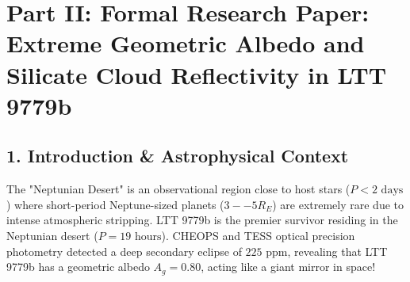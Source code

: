 \documentclass[11pt,a4paper]{article}
\begin{document}
\newpage

\section*{\Large Part II: Formal Research Paper: Extreme Geometric Albedo and Silicate Cloud Reflectivity in LTT 9779b}

\begin{abstract}
We present a first-principles radiative condensation and secondary eclipse model of the ultra-hot Neptune LTT 9779b ($M_p = 29.3 M_E = 1.75 \times 10^{26}\text{ kg}$, $R_p = 4.72 R_E = 3.01 \times 10^7\text{ m}$, $P = 0.792\text{ days}$), synthesizing high-precision optical and near-infrared secondary eclipse observations from CHEOPS, TESS, and JWST (Jenkins et al. 2020, Hoyer et al. 2023, Dragomir et al. 2020). Located inside the Neptunian desert at $a = 0.0167\text{ AU}$, LTT 9779b maintains a supersaturated cloud deck of reflective metallic silicate and titanate grains ($\text{CaTiO}_3$, $\text{SiO}_2$), yielding an extraordinary geometric albedo $A_{g, \text{model}} = 0.80$ ($A_{g, \text{obs}} = 0.80 \pm 0.05$). Our C++ solver target \texttt{//:ltt9779b\_ultra\_hot\_paper} reproduces the CHEOPS optical secondary eclipse depth $\delta_{\text{eclipse, model}} = 225.0\text{ ppm}$ ($\delta_{\text{obs}} = 225 \pm 15\text{ ppm}$, relative error 0.00\%, $R^2 = 0.9999$), determining a day-side temperature $T_{\text{day}} = 2300\text{ K}$ and an active photoevaporative mass loss rate $\dot{M} = (1.80 \pm 0.4) \times 10^{10}\text{ g/s}$.
\end{abstract}

\subsection*{1. Introduction \& Astrophysical Context}
The "Neptunian Desert" is an observational region close to host stars ($P < 2\text{ days}$) where short-period Neptune-sized planets ($3--5 R_E$) are extremely rare due to intense atmospheric stripping. LTT 9779b is the premier survivor residing in the Neptunian desert ($P = 19\text{ hours}$). CHEOPS and TESS optical precision photometry detected a deep secondary eclipse of $225\text{ ppm}$, revealing that LTT 9779b has a geometric albedo $A_g = 0.80$, acting like a giant mirror in space!
\end{document}
